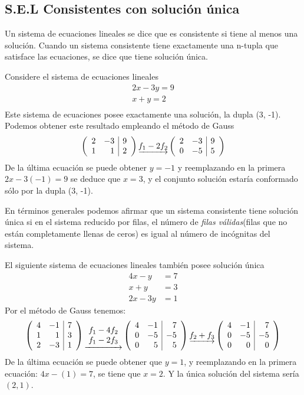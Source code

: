 \subsection{S.E.L Consistentes con solución única}
Un sistema de ecuaciones lineales se dice que es consistente si tiene al menos una solución. Cuando un sistema consistente tiene exactamente una n-tupla que satisface las ecuaciones, se dice que tiene solución única.

\begin{ejemplo}
Considere el sistema de ecuaciones lineales
\begin{align*}
2x-3y=9\\
x+y=2\\
\end{align*}
Este sistema de ecuaciones posee exactamente una solución, la dupla (3, -1). Podemos obtener este resultado empleando el método de Gauss
\begin{align*}
\reducir{rr|r}{
2&-3&9\\
1&1&2\\
}
\underrightarrow{f_1-2f_2}
\reducir{rr|r}{
2&-3&9\\
0&-5&5\\
}
\end{align*}
De la última ecuación se puede obtener $y=-1$ y reemplazando en la primera $2x-3(-1)=9$ se deduce que $x=3$, y el conjunto solución estaría conformado sólo por la dupla (3, -1).
\end{ejemplo}


En términos generales podemos afirmar que un sistema consistente tiene solución única si en el sistema reducido por filas, el número de \textit{filas válidas}(filas que no están completamente llenas de ceros) es igual al número de incógnitas del sistema. 


\begin{ejemplo}
El siguiente sistema de ecuaciones lineales también posee solución única
\begin{align*}
4x-y&=7\\
x+y&=3\\
2x-3y&=1
\end{align*}
Por el método de Gauss tenemos:
\begin{align*}
\reducir{rr|r}{
4&-1&7\\
1&1&3\\
2&-3&1\\
}
\underrightarrow{\begin{array}{c}
    f_1 - 4f_2  \\
    f_1 - 2f_3
\end{array}}
\reducir{rr|r}{
4&-1&7\\
0&-5&-5\\
0&5&5\\
}\underrightarrow{f_2 + f_3}
\reducir{rr|r}{
4&-1&7\\
0&-5&-5\\
0&0&0\\
}
\end{align*}
De la última ecuación se puede obtener que $y=1$, y reemplazando en la primera ecuación: $4x-(1)=7$, se tiene que $x=2$. Y la única solución del sistema sería $(2, 1)$.

\end{ejemplo}

